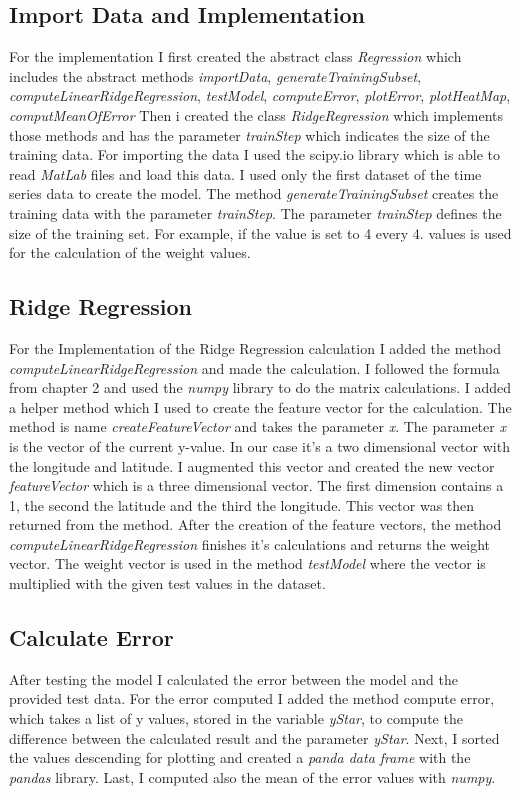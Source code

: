 \documentclass[10pt, a4paper, twocolumn]{article} %
\begin{document}
\subsection{Import Data and Implementation}
For the implementation I first created the abstract class \textit{Regression} which includes the abstract methods \textit{importData}, \textit{generateTrainingSubset}, \textit{computeLinearRidgeRegression}, \textit{testModel}, 
\textit{computeError}, \textit{plotError}, \textit{plotHeatMap}, \textit{computMeanOfError}
Then i created the class \textit{RidgeRegression} which implements those methods and has the parameter \textit{trainStep} which indicates the size of the training data. For importing the data I used the scipy.io library which is able to read \textit{MatLab} files and load this data. I used only the first dataset of the time series data to create the model. The method \textit{generateTrainingSubset} creates the training data with the parameter \textit{trainStep}. The parameter \textit{trainStep} defines the size of the training set. For example, if the value is set to 4 every 4. values is used for the calculation of the weight values. 

\subsection{Ridge Regression}
For the Implementation of the Ridge Regression calculation I added the method \textit{computeLinearRidgeRegression} and made the calculation. I followed the formula from chapter 2 and used the \textit{numpy} library to do the matrix calculations. I added a helper method which I used to create the feature vector for the calculation. The method is name \textit{createFeatureVector} and takes the parameter \textit{x}. The parameter \textit{x} is the vector of the current y-value. In our case it's a two dimensional vector with the longitude and latitude. I augmented this vector and created the new vector \textit{featureVector} which is a three dimensional vector. The first dimension contains a 1, the second the latitude and the third the longitude. This vector was then returned from the method. After the creation of the feature vectors, the method \textit{computeLinearRidgeRegression} finishes it's calculations and returns the weight vector. The weight vector is used in the method \textit{testModel} where the vector is multiplied with the given test values in the dataset. 

\subsection{Calculate Error}
After testing the model I calculated the error between the model and the provided test data. For the error computed I added the method compute error, which takes a list of y values, stored in the variable \textit{yStar}, to compute the difference between the calculated result and the parameter \textit{yStar}. Next, I sorted the values descending for plotting and created a \textit{panda data frame} with the \textit{pandas} library. Last, I computed also the mean of the error values with \textit{numpy}.
\end{document}
